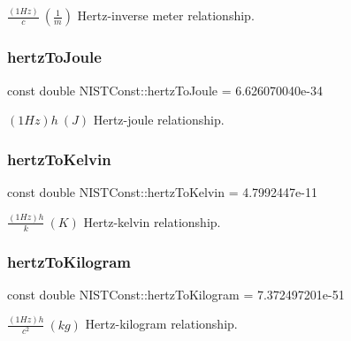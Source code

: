 $\frac{(1 Hz)}{c} \ (\frac{1}{m})$ Hertz-\/inverse meter relationship. \mbox{\label{group___n_i_s_t_const-_hertz_ga827c4e99287fcd5363fabcfe1381cc37}} 
\subsubsection{\texorpdfstring{hertz\+To\+Joule}{hertzToJoule}}
{\footnotesize\ttfamily const double N\+I\+S\+T\+Const\+::hertz\+To\+Joule = 6.\+626070040e-\/34}

$(1 Hz)h \ (J)$ Hertz-\/joule relationship. \mbox{\label{group___n_i_s_t_const-_hertz_gacda137a5d10ebba59b340d770802678f}} 
\subsubsection{\texorpdfstring{hertz\+To\+Kelvin}{hertzToKelvin}}
{\footnotesize\ttfamily const double N\+I\+S\+T\+Const\+::hertz\+To\+Kelvin = 4.\+7992447e-\/11}

$\frac{(1 Hz)h}{k} \ (K)$ Hertz-\/kelvin relationship. \mbox{\label{group___n_i_s_t_const-_hertz_ga7b63758ab74cb80c236d4eacd5b89484}} 
\subsubsection{\texorpdfstring{hertz\+To\+Kilogram}{hertzToKilogram}}
{\footnotesize\ttfamily const double N\+I\+S\+T\+Const\+::hertz\+To\+Kilogram = 7.\+372497201e-\/51}

$\frac{(1 Hz)h}{c^2} \ (kg)$ Hertz-\/kilogram relationship. 